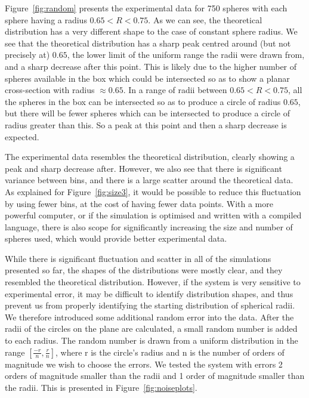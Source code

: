 \documentclass[journal]{IEEEtran}
\begin{document}
Figure~\ref{fig:random} presents the experimental data for 750 spheres with each
sphere having a radius $0.65 < R < 0.75$. As we can see, the theoretical
distribution has a very different shape to the case of constant sphere
radius. We see that the theoretical distribution has a sharp peak centred around
(but not precisely at) $0.65$, the lower limit of the uniform range the radii
were drawn from, and a sharp decrease after this point. This is likely due to
the higher number of spheres available in the box which could be intersected so
as to show a planar cross-section with radius $\approx 0.65$. In a range of
radii between $0.65 < R < 0.75$, all the spheres in the box can be intersected
so as to produce a circle of radius $0.65$, but there will be fewer spheres
which can be intersected to produce a circle of radius greater than this. So a
peak at this point and then a sharp decrease is expected.

The experimental data resembles the theoretical distribution, clearly showing a
peak and sharp decrease after. However, we also see that there is significant
variance between bins, and there is a large scatter around the theoretical
data. As explained for Figure~\ref{fig:size3}, it would be possible to reduce
this fluctuation by using fewer bins, at the cost of having fewer data
points. With a more powerful computer, or if the simulation is optimised and
written with a compiled language, there is also scope for significantly
increasing the size and number of spheres used, which would provide better
experimental data.

While there is significant fluctuation and scatter in all of the simulations
presented so far, the shapes of the distributions were mostly clear, and they
resembled the theoretical distribution. However, if the system is very sensitive
to experimental error, it may be difficult to identify distribution shapes, and
thus prevent us from properly identifying the starting distribution of spherical
radii. We therefore introduced some additional random error into the data. After
the radii of the circles on the plane are calculated, a small random number is
added to each radius. The random number is drawn from a uniform distribution in
the range $[\frac{-r}{n}, \frac{r}{n}]$, where r is the circle's radius and n is
the number of orders of magnitude we wish to choose the errors. We tested the
system with errors 2 orders of magnitude smaller than the radii and 1 order of
magnitude smaller than the radii. This is presented in
Figure~\ref{fig:noiseplots}. 
\end{document}
